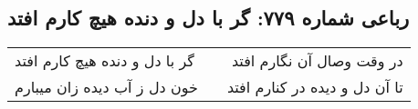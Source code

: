 \begin{center}
\section*{رباعی شماره ۷۷۹: گر با دل و دنده هیچ کارم افتد}
\label{sec:0779}
\begin{longtable}{l p{0.5cm} r}
گر با دل و دنده هیچ کارم افتد
&&
در وقت وصال آن نگارم افتد
\\
خون دل ز آب دیده زان میبارم
&&
تا آن دل و دیده در کنارم افتد
\\
\end{longtable}
\end{center}

